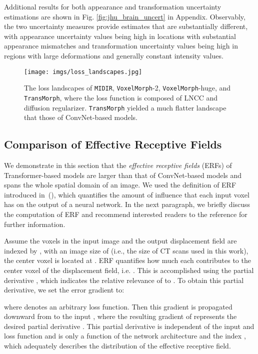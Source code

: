 \documentclass[times,twocolumn,final]{elsarticle}
\begin{document}
Additional results for both appearance and transformation uncertainty estimations are shown in Fig. \ref{fig:jhu_brain_uncert} in Appendix. Observably, the two uncertainty measures provide estimates that are substantially different, with appearance uncertainty values being high in locations with substantial appearance mismatches and transformation uncertainty values being high in regions with large deformations and generally constant intensity values.

\begin{figure*}[!h]
\centering
\texttt{[image: imgs/loss\_landscapes.jpg]}
\caption{The loss landscapes of \texttt{MIDIR}, \texttt{VoxelMorph}-2, \texttt{VoxelMorph}-huge, and \texttt{TransMorph}, where the loss function is composed of LNCC and diffusion regularizer. \texttt{TransMorph} yielded a much flatter landscape that those of ConvNet-based models. \label{fig:loss_landscape}}
\end{figure*}
\subsection{Comparison of Effective Receptive Fields}
\label{sec:comp_ERF}
We demonstrate in this section that the \textit{effective receptive fields} (ERFs) of Transformer-based models are larger than that of ConvNet-based models and spans the whole spatial domain of an image. We used the definition of ERF introduced in~(\cite{luo2016understanding}), which quantifies the amount of influence that each input voxel has on the output of a neural network. In the next paragraph, we briefly discuss the computation of ERF and recommend interested readers to the reference for further information.

Assume the voxels in the input image  and the output displacement field  are indexed by , with an image size of  (i.e., the size of CT scans used in this work), the center voxel is located at . ERF quantifies how much each  contributes to the center voxel of the displacement field, i.e. . This is accomplished using the partial derivative , which indicates the relative relevance of  to . To obtain this partial derivative, we set the error gradient to:
\begin{linenomath}

\end{linenomath}
where  denotes an arbitrary loss function. Then this gradient is propagated downward from  to the input , where the resulting gradient of  represents the desired partial derivative . This partial derivative is independent of the input and loss function and is only a function of the network architecture and the index , which adequately describes the distribution of the effective receptive field.
\end{document}
